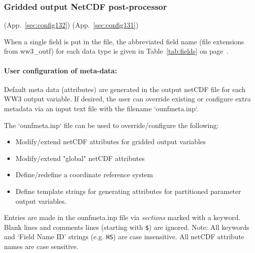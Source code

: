 \vsssub
\subsubsection{Gridded output NetCDF post-processor} \label{sec:ww3ounf}
\vsssub

 (App.~\ref{sec:config132})
 (App.~\ref{sec:config131})


\vspace{\baselineskip}

\noindent
When a single field is put in the file, the abbreviated field name (file
extensions from ww3\_outf) for each data type is given in
Table~\ref{tab:fields} on page~\pageref{tab:fields}.

\noindent
\paragraph{User configuration of meta-data:}

\noindent
Default meta data (attributes) are generated in the output netCDF file
for each WW3 output variable. If desired, the user can override existing or
configure extra metadata via an input text file with the filename `ounfmeta.inp`.


\noindent
The `ounfmeta.inp` file can be used to override/configure the following:
\begin{itemize}
  \item Modify/extend netCDF attributes for gridded output variables
  \item Modify/extend "global" netCDF attributes
  \item Define/redefine a coordinate reference system
  \item Define template strings for generating attributes for
        partitioned parameter output variables.
\end{itemize}

\noindent
Entries are made in the ounfmeta.inp file via \emph{sections} marked with a keyword.
Blank lines and comments lines (starting with \texttt{\$}) are ignored.
Note: All keywords and `Field Name ID' strings (e.g. \texttt{HS}) are
case insensitive. All netCDF attribute names are case sensitive.

